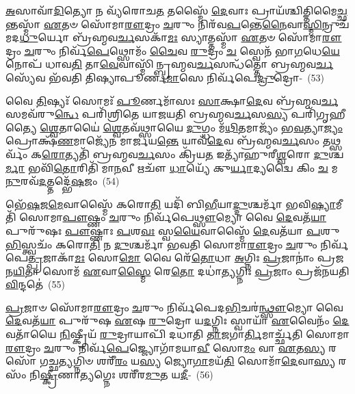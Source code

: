 {\anuvakamend[{𑌬𑍍𑌰𑌹𑍍𑌮᳴\-\ul{𑌣𑍈}\-𑌵𑍈𑌨᳴\-\ul{𑌮}\-𑌭𑌿𑌚᳴𑌰𑌤𑌿 \ul{𑌯}\-𑌜𑍍𑌞𑍋 𑌨 𑌤𑌾\-\ul{𑌵𑍇}\-𑌵𑌾𑌸𑍍𑌯𑍇॑\-\ul{𑌨𑍍𑌦𑍍𑌰𑌿}\-𑌯𑌮𑌾॑𑌪𑍍𑌨𑍋𑌤𑌿 \ul{𑌦𑍇}\-𑌵𑌤𑌾𑌃॑ \ul{𑌸}\-𑌪𑍍𑌤𑌤𑍍𑌰𑌿𑍞᳴𑌶𑌚𑍍𑌚।}]}

\-\ul{𑌅}\-𑌸𑌾𑌵𑌾᳴\-\ul{𑌦𑌿}\-𑌤𑍍𑌯𑍋 𑌨 𑌵𑍍𑌯᳴𑌰𑍋𑌚\-\ul{𑌤} 𑌤𑌸𑍍𑌮𑍈᳴ \ul{𑌦𑍇}\-𑌵𑌾𑌃 𑌪𑍍𑌰𑌾𑌯᳴𑌶𑍍𑌚𑌿𑌤𑍍𑌤𑌿\-𑌮𑍈\-\ul{𑌚𑍍𑌛}\-𑌨𑍍𑌤𑌸𑍍𑌮𑌾᳴ \ul{𑌏}\-𑌤𑍞 𑌸𑍋᳴𑌮𑌾\-\ul{𑌰𑍗}\-𑌦𑍍𑌰𑌂 \ul{𑌚}\-𑌰𑍁𑌂 𑌨𑌿𑌰᳴𑌵\-\ul{𑌪}\-𑌨𑍍𑌤𑍇\-\ul{𑌨𑍈}\-𑌵𑌾\-\ul{𑌸𑍍𑌮𑌿}\-𑌨𑍍𑌰𑍁𑌚᳴𑌮𑌦\-\-\ul{𑌧𑍁}\-𑌰𑍍𑌯𑍋 𑌬𑍍𑌰᳴𑌹𑍍𑌮𑌵\-\ul{𑌰𑍍𑌚}\-𑌸𑌕𑌾᳴\-\ul{𑌮𑌃} 𑌸𑍍𑌯𑌾𑌤𑍍𑌤𑌸𑍍𑌮𑌾᳴ \ul{𑌏}\-𑌤𑍞 𑌸𑍋᳴𑌮𑌾\-\ul{𑌰𑍗}\-𑌦𑍍𑌰𑌂 \ul{𑌚}\-𑌰𑍁𑌂 𑌨𑌿𑌰𑍍𑌵᳴\-\ul{𑌪𑍇}\-𑌥𑍍𑌸𑍋𑌮𑌂᳴ \ul{𑌚𑍈}\-𑌵 \ul{𑌰𑍁}\-𑌦𑍍𑌰𑌂 \ul{𑌚} 𑌸𑍍𑌵𑍇𑌨᳴ 𑌭𑌾\-\ul{𑌗}\-𑌧𑍇\-\ul{𑌯𑍇}\-𑌨𑍋𑌪᳴ 𑌧𑌾𑌵\-\ul{𑌤𑌿} 𑌤𑌾\-\ul{𑌵𑍇}\-𑌵𑌾𑌸𑍍𑌮𑌿᳴𑌨𑍍𑌬𑍍𑌰𑌹𑍍𑌮𑌵\-\ul{𑌰𑍍𑌚}\-𑌸𑌨𑍍𑌧᳴𑌤𑍍𑌤𑍋 𑌬𑍍𑌰𑌹𑍍𑌮𑌵\-\ul{𑌰𑍍𑌚}\-𑌸𑍍𑌯𑍇᳴𑌵 𑌭᳴𑌵𑌤𑌿 𑌤𑌿𑌷𑍍𑌯𑌾𑌪𑍂𑌰𑍍𑌣\-\ul{𑌮𑌾}\-𑌸𑍇 𑌨𑌿𑌰𑍍𑌵᳴𑌪𑍇\-\ul{𑌦𑍍𑌰𑍁}\-𑌦𑍍𑌰𑍋-~(53)

𑌵𑍈 \ul{𑌤𑌿}\-𑌷𑍍𑌯𑌃᳴ 𑌸𑍋𑌮𑌃᳴ \ul{𑌪𑍂}\-𑌰𑍍𑌣𑌮𑌾᳴𑌸𑌃 \ul{𑌸𑌾}\-𑌕𑍍𑌷𑌾\-\ul{𑌦𑍇}\-𑌵 𑌬𑍍𑌰᳴𑌹𑍍𑌮𑌵\-\ul{𑌰𑍍𑌚}\-𑌸𑌮𑌵᳴\-𑌰𑍁\-\ul{𑌨𑍍𑌧𑍇} 𑌪𑌰𑌿᳴𑌶𑍍𑌰𑌿𑌤𑍇 𑌯𑌾𑌜𑌯𑌤𑌿 𑌬𑍍𑌰𑌹𑍍𑌮𑌵\-\ul{𑌰𑍍𑌚}\-𑌸\-\ul{𑌸𑍍𑌯} 𑌪𑌰𑌿᳴𑌗𑍃𑌹𑍀𑌤𑍍𑌯𑍈 \ul{𑌶𑍍𑌵𑍇}\-𑌤𑌾𑌯𑍈॑ \ul{𑌶𑍍𑌵𑍇}\-𑌤𑌵᳴𑌥𑍍𑌸𑌾𑌯𑍈 \ul{𑌦𑍁}\-𑌗𑍍𑌧𑌂 𑌮᳴\-\ul{𑌥𑌿}\-𑌤𑌮𑌾𑌜𑍍𑌯𑌂᳴ 𑌭\-\ul{𑌵}\-𑌤𑍍𑌯𑌾\-\ul{𑌜𑍍𑌯𑌂} 𑌪𑍍𑌰𑍋𑌕𑍍𑌷᳴\-\ul{𑌣}\-𑌮𑌾𑌜𑍍𑌯𑍇᳴𑌨 𑌮𑌾𑌰𑍍𑌜𑌯\-\ul{𑌨𑍍𑌤𑍇} 𑌯𑌾𑌵᳴\-\ul{𑌦𑍇}\-𑌵 𑌬𑍍𑌰᳴𑌹𑍍𑌮𑌵\-\ul{𑌰𑍍𑌚}\-𑌸𑌂 𑌤𑌥𑍍𑌸𑌰𑍍𑌵𑌂᳴ 𑌕\-\ul{𑌰𑍋}\-𑌤𑍍𑌯𑌤𑌿᳴ 𑌬𑍍𑌰𑌹𑍍𑌮𑌵\-\ul{𑌰𑍍𑌚}\-𑌸𑌂 𑌕𑍍𑌰𑌿᳴𑌯\-\ul{𑌤} 𑌇𑌤𑍍𑌯𑌾᳴𑌹𑍁𑌰𑍀\-\ul{𑌶𑍍𑌵}\-𑌰𑍋 \ul{𑌦𑍁}\-𑌶𑍍𑌚\-\ul{𑌰𑍍𑌮𑌾} 𑌭𑌵𑌿᳴\-\ul{𑌤𑍋}\-𑌰𑌿𑌤𑌿᳴ 𑌮𑌾\-\ul{𑌨}\-𑌵𑍀 𑌋𑌚𑍗᳴ \ul{𑌧𑌾}\-𑌯𑍍𑌯𑍇᳴ 𑌕𑍁\-\ul{𑌰𑍍𑌯𑌾}\-𑌦𑍍𑌯𑌦𑍍𑌵𑍈 𑌕𑌿𑌂 \ul{𑌚} 𑌮\-\ul{𑌨𑍁}\-𑌰𑌵᳴\-\ul{𑌦}\-𑌤𑍍𑌤𑌦𑍍𑌭𑍇᳴\-\ul{𑌷}\-𑌜𑌂~(54)

𑌭𑍇᳴\-\ul{𑌷}\-𑌜\-\ul{𑌮𑍇}\-𑌵𑌾𑌸𑍍𑌮𑍈᳴ 𑌕𑌰𑍋\-\ul{𑌤𑌿} 𑌯𑌦𑌿᳴ 𑌬𑌿\-\ul{𑌭𑍀}\-𑌯𑌾\-\ul{𑌦𑍍𑌦𑍁}\-𑌶𑍍𑌚𑌰𑍍𑌮𑌾᳴ 𑌭𑌵𑌿\-\ul{𑌷𑍍𑌯𑌾}\-𑌮𑍀𑌤𑌿᳴ 𑌸𑍋𑌮𑌾\-\ul{𑌪𑍗}\-𑌷𑍍𑌣𑌂 \ul{𑌚}\-𑌰𑍁𑌂 𑌨𑌿𑌰𑍍𑌵᳴𑌪𑍇\-\ul{𑌥𑍍𑌸𑍗}\-𑌮𑍍𑌯𑍋 𑌵𑍈 \ul{𑌦𑍇}\-𑌵𑌤᳴\-\ul{𑌯𑌾} 𑌪𑍁𑌰𑍁᳴𑌷𑌃 \ul{𑌪𑍗}\-𑌷𑍍𑌣𑌾𑌃 \ul{𑌪}\-𑌶\-\ul{𑌵𑌃} 𑌸𑍍𑌵\-\ul{𑌯𑍈}\-𑌵𑌾𑌸𑍍𑌮𑍈᳴ \ul{𑌦𑍇}\-𑌵𑌤᳴𑌯𑌾 \ul{𑌪}\-𑌶𑍁\-\ul{𑌭𑌿}\-𑌸𑍍𑌤𑍍𑌵𑌚𑌂᳴ 𑌕𑌰𑍋\-\ul{𑌤𑌿} 𑌨 \ul{𑌦𑍁}\-𑌶𑍍𑌚𑌰𑍍𑌮𑌾᳴ 𑌭𑌵𑌤𑌿 𑌸𑍋𑌮𑌾\-\ul{𑌰𑍗}\-𑌦𑍍𑌰𑌂 \ul{𑌚}\-𑌰𑍁𑌂 𑌨𑌿𑌰𑍍𑌵᳴𑌪𑍇\-\ul{𑌤𑍍𑌪𑍍𑌰}\-𑌜𑌾𑌕𑌾᳴\-\ul{𑌮𑌃} 𑌸𑍋\-\ul{𑌮𑍋} 𑌵𑍈 𑌰𑍇᳴\-\ul{𑌤𑍋}\-𑌧𑌾 \ul{𑌅}\-𑌗𑍍𑌨𑌿𑌃 \ul{𑌪𑍍𑌰}\-𑌜𑌾𑌨𑌾𑌂॑ 𑌪𑍍𑌰𑌜𑌨\-\ul{𑌯𑌿}\-𑌤𑌾 𑌸𑍋𑌮᳴ \ul{𑌏}\-𑌵𑌾\-\ul{𑌸𑍍𑌮𑍈} 𑌰𑍇\-\ul{𑌤𑍋} 𑌦𑌧𑌾॑\-\ul{𑌤𑍍𑌯}\-𑌗𑍍𑌨𑌿𑌃 \ul{𑌪𑍍𑌰}\-𑌜𑌾𑌂 𑌪𑍍𑌰𑌜᳴𑌨𑌯𑌤𑌿 \ul{𑌵𑌿}\-𑌨𑍍𑌦𑌤𑍇॑~(55)

\-\ul{𑌪𑍍𑌰}\-𑌜𑌾𑍞 𑌸𑍋᳴𑌮𑌾\-\ul{𑌰𑍗}\-𑌦𑍍𑌰𑌂 \ul{𑌚}\-𑌰𑍁𑌂 𑌨𑌿𑌰𑍍𑌵᳴𑌪𑍇𑌦\-\ul{𑌭𑌿}\-𑌚𑌰॑\-\ul{𑌨𑍍𑌥𑍍𑌸𑍗}\-𑌮𑍍𑌯𑍋 𑌵𑍈 \ul{𑌦𑍇}\-𑌵𑌤᳴\-\ul{𑌯𑌾} 𑌪𑍁𑌰𑍁᳴𑌷 \ul{𑌏}\-𑌷 \ul{𑌰𑍁}\-𑌦𑍍𑌰𑍋 𑌯\-\ul{𑌦}\-𑌗𑍍𑌨𑌿𑌃 𑌸𑍍𑌵𑌾𑌯𑌾᳴ \ul{𑌏}\-𑌵𑍈𑌨𑌂᳴ \ul{𑌦𑍇}\-𑌵𑌤𑌾᳴𑌯𑍈 \ul{𑌨𑌿}\-𑌷𑍍𑌕𑍍𑌰𑍀𑌯᳴ \ul{𑌰𑍁}\-𑌦𑍍𑌰𑌾𑌯𑌾𑌪𑌿᳴ 𑌦𑌧𑌾𑌤𑌿 \ul{𑌤𑌾}\-𑌜𑌗𑌾\-\ul{𑌰𑍍𑌤𑌿}\-𑌮𑌾𑌰𑍍𑌚𑍍𑌛᳴𑌤𑌿 𑌸𑍋𑌮𑌾\-\ul{𑌰𑍗}\-𑌦𑍍𑌰𑌂 \ul{𑌚}\-𑌰𑍁𑌂 𑌨𑌿𑌰𑍍𑌵᳴\-\ul{𑌪𑍇}\-𑌜𑍍𑌜𑍍𑌯𑍋𑌗𑌾᳴𑌮𑌯𑌾\-\ul{𑌵𑍀} 𑌸𑍋\-\ul{𑌮𑌂} 𑌵𑌾 \ul{𑌏}\-𑌤\-\ul{𑌸𑍍𑌯} 𑌰𑌸𑍋᳴ 𑌗𑌚𑍍𑌛\-\ul{𑌤𑍍𑌯}\-𑌗𑍍𑌨𑌿𑍞 𑌶𑌰𑍀᳴\-\ul{𑌰𑌂} 𑌯\-\ul{𑌸𑍍𑌯} 𑌜𑍍𑌯𑍋\-\ul{𑌗𑌾}\-𑌮𑌯᳴\-\ul{𑌤𑌿} 𑌸𑍋𑌮𑌾᳴\-\ul{𑌦𑍇}\-𑌵𑌾\-\ul{𑌸𑍍𑌯} 𑌰𑌸𑌂᳴ 𑌨𑌿\-\ul{𑌷𑍍𑌕𑍍𑌰𑍀}\-𑌣𑌾\-\ul{𑌤𑍍𑌯}\-𑌗𑍍𑌨𑍇𑌃 𑌶𑌰𑍀᳴𑌰\-\ul{𑌮𑍁}\-𑌤 𑌯\-\ul{𑌦𑍀}\--~(56)

